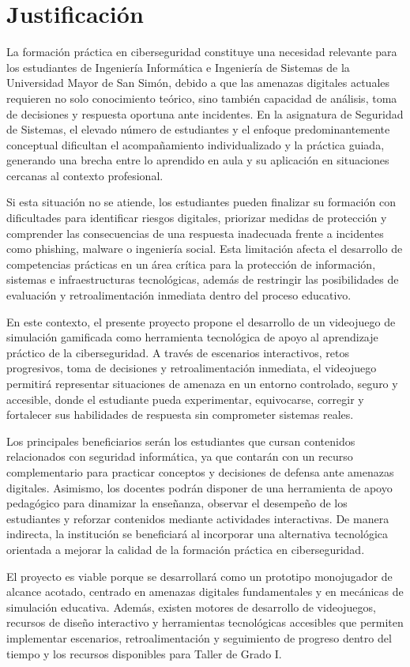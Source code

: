 \section{Justificación}

La formación práctica en ciberseguridad constituye una necesidad relevante para los estudiantes de Ingeniería Informática e Ingeniería de Sistemas de la Universidad Mayor de San Simón, debido a que las amenazas digitales actuales requieren no solo conocimiento teórico, sino también capacidad de análisis, toma de decisiones y respuesta oportuna ante incidentes. En la asignatura de Seguridad de Sistemas, el elevado número de estudiantes y el enfoque predominantemente conceptual dificultan el acompañamiento individualizado y la práctica guiada, generando una brecha entre lo aprendido en aula y su aplicación en situaciones cercanas al contexto profesional.

Si esta situación no se atiende, los estudiantes pueden finalizar su formación con dificultades para identificar riesgos digitales, priorizar medidas de protección y comprender las consecuencias de una respuesta inadecuada frente a incidentes como phishing, malware o ingeniería social. Esta limitación afecta el desarrollo de competencias prácticas en un área crítica para la protección de información, sistemas e infraestructuras tecnológicas, además de restringir las posibilidades de evaluación y retroalimentación inmediata dentro del proceso educativo.

En este contexto, el presente proyecto propone el desarrollo de un videojuego de simulación gamificada como herramienta tecnológica de apoyo al aprendizaje práctico de la ciberseguridad. A través de escenarios interactivos, retos progresivos, toma de decisiones y retroalimentación inmediata, el videojuego permitirá representar situaciones de amenaza en un entorno controlado, seguro y accesible, donde el estudiante pueda experimentar, equivocarse, corregir y fortalecer sus habilidades de respuesta sin comprometer sistemas reales.

Los principales beneficiarios serán los estudiantes que cursan contenidos relacionados con seguridad informática, ya que contarán con un recurso complementario para practicar conceptos y decisiones de defensa ante amenazas digitales. Asimismo, los docentes podrán disponer de una herramienta de apoyo pedagógico para dinamizar la enseñanza, observar el desempeño de los estudiantes y reforzar contenidos mediante actividades interactivas. De manera indirecta, la institución se beneficiará al incorporar una alternativa tecnológica orientada a mejorar la calidad de la formación práctica en ciberseguridad.

El proyecto es viable porque se desarrollará como un prototipo monojugador de alcance acotado, centrado en amenazas digitales fundamentales y en mecánicas de simulación educativa. Además, existen motores de desarrollo de videojuegos, recursos de diseño interactivo y herramientas tecnológicas accesibles que permiten implementar escenarios, retroalimentación y seguimiento de progreso dentro del tiempo y los recursos disponibles para Taller de Grado I.

